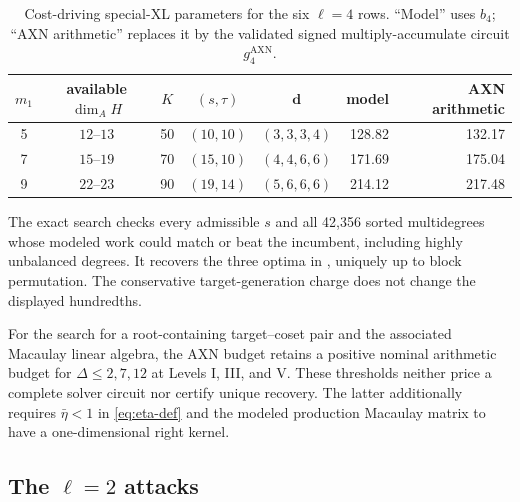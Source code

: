 \documentclass[11pt]{article}
\begin{document}
\begin{table}[tbp]
\centering
\caption{Cost-driving special-XL parameters for the six $\ell=4$ rows.
``Model'' uses $b_4$; ``AXN arithmetic'' replaces it by the validated
signed multiply-accumulate circuit $g_4^{\mathrm{AXN}}$.}
\label{tab:xl-optima}
\scriptsize
\setlength{\tabcolsep}{4pt}
\begin{tabular}{@{}c c c c c r r@{}}
\toprule
$m_1$ & available $\dim_A H$ & $K$ & $(s,\tau)$ & $\mathbf d$ & model & AXN arithmetic\\
\midrule
5 & $12$--$13$ & 50 & $(10,10)$ & $(3,3,3,4)$ & 128.82 & 132.17\\
7 & $15$--$19$ & 70 & $(15,10)$ & $(4,4,6,6)$ & 171.69 & 175.04\\
9 & $22$--$23$ & 90 & $(19,14)$ & $(5,6,6,6)$ & 214.12 & 217.48\\
\bottomrule
\end{tabular}
\end{table}

The exact search checks every admissible $s$ and all 42,356 sorted
multidegrees whose modeled work could match or beat the incumbent, including
highly unbalanced degrees.  It recovers the three optima in
, uniquely up to block permutation.  The conservative
target-generation charge does not change the displayed hundredths.

For the search for a root-containing target--coset pair and the associated
Macaulay linear algebra, the AXN budget retains
a positive nominal arithmetic budget for $\Delta\le2,7,12$ at Levels I, III,
and V.
These thresholds neither price a complete solver circuit nor certify unique
recovery.  The latter additionally requires $\bar\eta<1$ in
\eqref{eq:eta-def} and the modeled production Macaulay matrix to have a
one-dimensional right kernel.

\subsection{The \texorpdfstring{$\ell=2$}{l=2} attacks}
\end{document}

